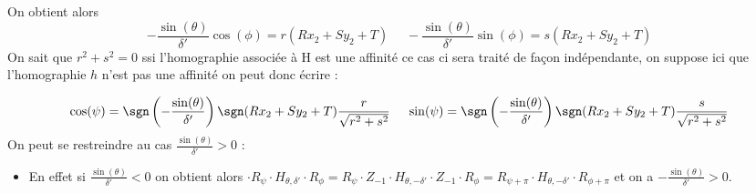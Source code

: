 On obtient alors 
 \begin{equation*}
 -\frac{\sin(\theta)}{\delta'}\cos(\phi)=r(R x_2 + S y_2 +T)~~~~~~ -\frac{\sin(\theta)}{\delta'}\sin(\phi)=s(R x_2 + S y_2 +T)
 \end{equation*}
 On sait que $r^{2}+s^{2}=0$ ssi l'homographie associée à H est une affinité ce cas ci sera traité de façon indépendante, on suppose ici que l'homographie $h$  n'est pas une affinité on peut donc écrire :
 
 \begin{equation*}
 \cos(\psi)=\sgn\left(-\frac{\sin(\theta)}{ \delta'}\right)\sgn(R x_2 + S y_2 +T)\frac{r}{\sqrt{r^{2}+s^{2}}}~~~~\sin(\psi)=\sgn\left(-\frac{\sin(\theta)}{ \delta'}\right)\sgn(R x_2 + S y_2 +T)\frac{s}{\sqrt{r^{2}+s^{2}}}
 \end{equation*}
 On peut se restreindre au cas $\frac{\sin(\theta)}{\delta'}>0$ :\\
 \begin{itemize}
 \item En effet si $\frac{\sin(\theta)}{\delta'}<0$ on obtient alors $\cdot R_{\psi} \cdot H_{\theta,\delta'} \cdot R_{\phi}=R_{\psi} \cdot Z_{-1}\cdot H_{\theta,-\delta'}\cdot Z_{-1} \cdot R_{\phi}= R_{\psi+\pi} \cdot H_{\theta,-\delta'}\cdot R_{\phi+\pi}$ et on a $-\frac{\sin(\theta)}{\delta'}>0$.\\
 \end{itemize}



